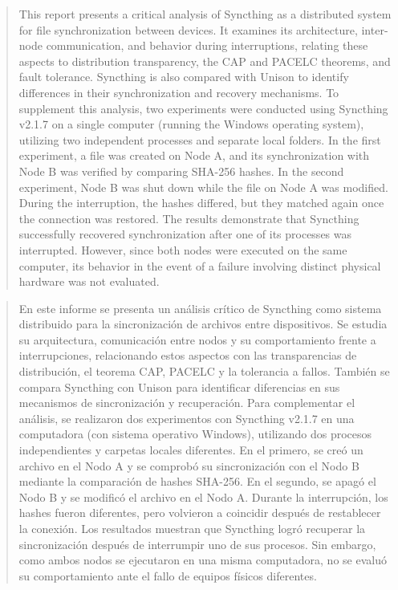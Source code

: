 \documentclass[12pt,a4paper]{article}
\begin{document}
\begin{abstract}
This report presents a critical analysis of Syncthing as a distributed system for file synchronization between devices. 
It examines its architecture, inter-node communication, and behavior during interruptions, relating these aspects to distribution transparency, 
the CAP and PACELC theorems, and fault tolerance. Syncthing is also compared with Unison to identify differences in their synchronization and recovery mechanisms.
To supplement this analysis, two experiments were conducted using Syncthing v2.1.7 on a single computer (running the Windows operating system), 
utilizing two independent processes and separate local folders. In the first experiment, a file was created on Node A, and its synchronization with Node B was verified by comparing SHA-256 hashes. In the second experiment, Node B was shut down while the file on Node A was modified. During the interruption, the hashes differed, but they matched again once the connection was restored.
The results demonstrate that Syncthing successfully recovered synchronization after one of its processes was interrupted. However, since both 
nodes were executed on the same computer, its behavior in the event of a failure involving distinct physical hardware was not evaluated.
\end{abstract}

\begin{abstract}
    En este informe se presenta un análisis crítico de Syncthing como sistema distribuido para la sincronización de archivos 
    entre dispositivos. Se estudia su arquitectura, comunicación entre nodos y su comportamiento frente a interrupciones, relacionando estos 
    aspectos con las transparencias de distribución, el teorema CAP, PACELC y la tolerancia a fallos. También se compara Syncthing con Unison para identificar 
    diferencias en sus mecanismos de sincronización y recuperación.
    Para complementar el análisis, se realizaron dos experimentos con Syncthing v2.1.7 en una computadora (con sistema operativo Windows), utilizando 
    dos procesos independientes y carpetas locales diferentes. En el primero, se creó un archivo en el Nodo A y se comprobó su sincronización con el Nodo B mediante la comparación de hashes SHA-256. 
    En el segundo, se apagó el Nodo B y se modificó el archivo en el Nodo A. Durante la interrupción, los hashes fueron diferentes, pero volvieron a coincidir después de restablecer la conexión.
    Los resultados muestran que Syncthing logró recuperar la sincronización después de interrumpir uno de sus procesos. Sin embargo, como ambos nodos se ejecutaron en una misma computadora, no 
    se evaluó su comportamiento ante el fallo de equipos físicos diferentes.
\end{abstract}
\end{document}
